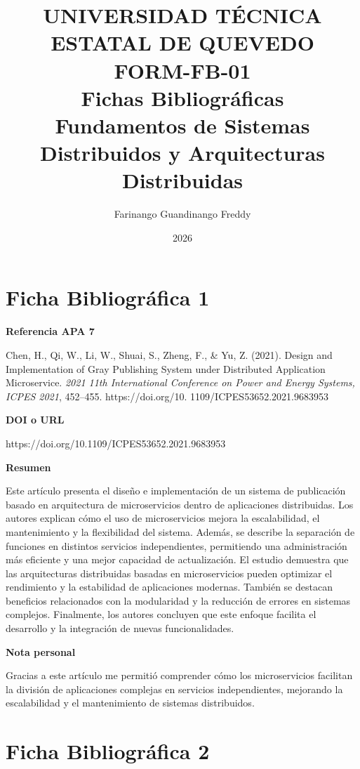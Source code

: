 \documentclass[12pt]{article}
\title{UNIVERSIDAD TÉCNICA ESTATAL DE QUEVEDO 
\\FORM-FB-01 \\ Fichas Bibliográficas \\ Fundamentos de Sistemas Distribuidos y Arquitecturas Distribuidas}
\author{Farinango Guandinango Freddy }
\date{2026}
\begin{document}
\maketitle
\section*{Ficha Bibliográfica 1}

\textbf{Referencia APA 7}

Chen, H., Qi, W., Li, W., Shuai, S., Zheng, F., \& Yu, Z. (2021). Design and Implementation of Gray Publishing System under Distributed Application Microservice. \textit{2021 11th International Conference on Power and Energy Systems, ICPES 2021}, 452–455. 
https://doi.org/10.
1109/ICPES53652.2021.9683953

\vspace{0.3cm}

\textbf{DOI o URL}

https://doi.org/10.1109/ICPES53652.2021.9683953

\vspace{0.3cm}

\textbf{Resumen}

Este artículo presenta el diseño e implementación de un sistema de publicación basado en arquitectura de microservicios dentro de aplicaciones distribuidas. Los autores explican cómo el uso de microservicios mejora la escalabilidad, el mantenimiento y la flexibilidad del sistema. Además, se describe la separación de funciones en distintos servicios independientes, permitiendo una administración más eficiente y una mejor capacidad de actualización. El estudio demuestra que las arquitecturas distribuidas basadas en microservicios pueden optimizar el rendimiento y la estabilidad de aplicaciones modernas. También se destacan beneficios relacionados con la modularidad y la reducción de errores en sistemas complejos. Finalmente, los autores concluyen que este enfoque facilita el desarrollo y la integración de nuevas funcionalidades.

\vspace{0.3cm}

\textbf{Nota personal}

Gracias a este  artículo me permitió comprender cómo los microservicios facilitan la división de aplicaciones complejas en servicios independientes, mejorando la escalabilidad y el mantenimiento de sistemas distribuidos. 


\section*{Ficha Bibliográfica 2}
\end{document}
